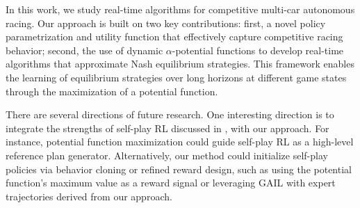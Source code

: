 In this work, we study real-time algorithms for competitive multi-car autonomous racing. Our approach is built on two key contributions: first, a novel policy parametrization and utility function that effectively capture competitive racing behavior; second, the use of dynamic \(\alpha\)-potential functions to develop real-time algorithms that approximate Nash equilibrium strategies. This framework enables the learning of equilibrium strategies over long horizons at different game states through the maximization of a potential function.

There are several directions of future research. One interesting direction is to integrate the strengths of self-play RL discussed in \cite{thakkar2022hierarchical}, with our approach. For instance, potential function maximization could guide self-play RL as a high-level reference plan generator. Alternatively, our method could initialize self-play policies via behavior cloning or refined reward design, such as using the potential function's maximum value as a reward signal or leveraging GAIL \cite{Ho2016GenerativeAI} with expert trajectories derived from our approach.